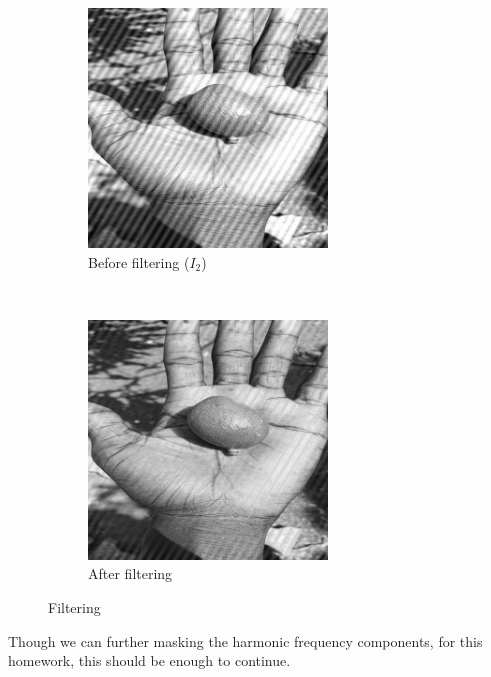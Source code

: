 \documentclass[12pt]{article}
\begin{document}
\begin{figure}[H]
    \centering
    \begin{subfigure}[t]{0.5\textwidth}
        \centering
        \includegraphics[height=2.5in]{images/stripe_before}
        \caption{Before filtering ($I_2$)}
    \end{subfigure}%
    ~
    \begin{subfigure}[t]{0.5\textwidth}
        \centering
        \includegraphics[height=2.5in]{images/stripe_after}
        \caption{After filtering}
    \end{subfigure}
    \caption{Filtering}
    \label{fig:stripe_filter}
\end{figure}
\noindent
Though we can further masking the harmonic frequency components, for this homework, this should be enough to continue.
\end{document}
